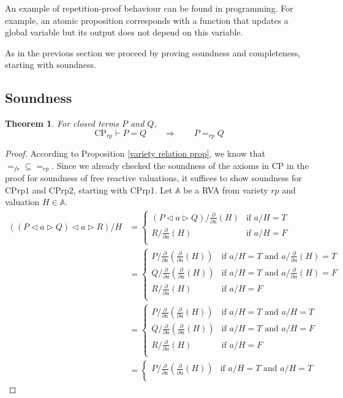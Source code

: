 \documentclass[a4paper,twoside,openright]{report}
\newcommand{\dd}[1]{\frac{\partial}{\partial #1}}
\newcommand{\CPrp}[1]{\ensuremath{\mathrm{CPrp#1}}}
\newcommand{\lef}{\ensuremath{\triangleleft}}
\newcommand{\rig}{\ensuremath{\triangleright}}
\newtheorem{thm}[theorem]{Theorem}
\begin{document}
An example of repetition-proof behaviour can be found in programming. For example, an atomic proposition corresponds with a function that updates a global variable but its output does not depend on this variable.




As in the previous section we proceed by proving soundness and completeness, starting with soundness.

\subsection{Soundness}

\begin{thm}
For closed terms $P$ and $Q$,
\[
\text{CP}_{rp}\vdash P=Q\qquad\Longrightarrow\qquad P=_{rp}Q
\]
\end{thm}
\begin{proof}
According to Proposition \ref{variety relation prop}, we know that $=_{fr}\subseteq =_{rp}$. Since we already checked the soundness of the axioms in CP in the proof for soundness of free reactive valuations, it suffices to show soundness for $\CPrp1$ and $\CPrp2$, starting with CPrp1. Let $\mathbb{A}$ be a RVA from variety $rp$ and valuation $H\in\mathbb{A}$.
\begin{align*}
((P\lef a\rig Q)\lef a\rig R)/H
&=\begin{cases}
(P\lef a\rig Q)/\dd a(H) & \text{if $a/H=T$}\\
R/\dd a(H) & \text{if $a/H=F$}\\
\end{cases}\\
&=\begin{cases}
P/\dd a(\dd a(H)) & \text{if $a/H=T$ and $a/\dd a(H)=T$}\\
Q/\dd a(\dd a(H)) & \text{if $a/H=T$ and $a/\dd a(H)=F$}\\
R/\dd a(H) & \text{if $a/H=F$}\\
\end{cases}\\
&=\begin{cases}
P/\dd a(\dd a(H)) & \text{if $a/H=T$ and $a/H=T$}\\
Q/\dd a(\dd a(H)) & \text{if $a/H=T$ and $a/H=F$}\\
R/\dd a(H) & \text{if $a/H=F$}\\
\end{cases}\\
&=\begin{cases}
P/\dd a(\dd a(H)) & \text{if $a/H=T$ and $a/H=T$}\\

\end{cases}
\end{align*}
\end{proof}
\end{document}
